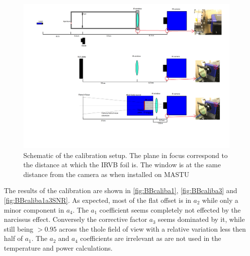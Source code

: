 \begin{figure}
	\centering
	\includegraphics[trim={800 300 0 1200},clip,width=\linewidth]{Chapters/appendix1/figs/calib_schematics.png}
	\caption{Schematic of the calibration setup. The plane in focus correspond to the distance at which the IRVB foil is. The window is at the same distance from the camera as when installed on MASTU}
	\label{fig:BBcalib}
\end{figure}

The results of the calibration are shown in \autoref{fig:BBcaliba1}, \ref{fig:BBcaliba3} and \ref{fig:BBcaliba1a3SNR}. As expected, most of the flat offset is in $a_2$ while only a minor component in $a_4$. The $a_1$ coefficient seems completely not effected by the narcissus effect. Conversely the corrective factor $a_3$ seems dominated by it, while still being $>0.95$ across the thole field of view with a relative variation less then half of $a_1$. The $a_2$ and $a_4$ coefficients are irrelevant as are not used in the temperature and power calculations.

